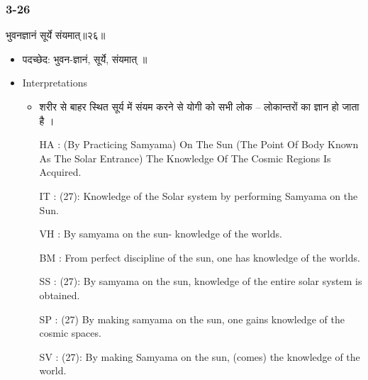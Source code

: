 \begin{frame}[fragile]\frametitle{3-26}
\begin{sanskrit}
भुवनज्ञानं सूर्ये संयमात्॥२६॥
\end{sanskrit}

	\begin{itemize}
	\item पदच्छेद:  भुवन-ज्ञानं, सूर्ये, संयमात् ॥
	\item Interpretations
		\begin{itemize}	
		\item  शरीर से बाहर स्थित सूर्य में संयम करने से योगी को सभी लोक – लोकान्तरों का ज्ञान हो जाता है ।
		\item [HA]: (By Practicing Samyama) On The Sun (The Point Of Body Known As The Solar Entrance) The Knowledge Of The Cosmic Regions Is Acquired.
		\item [IT]: (27): Knowledge of the Solar system by performing Samyama on the Sun.
		\item [VH]: By samyama on the sun- knowledge of the worlds.
		\item [BM]: From perfect discipline of the sun, one has knowledge of the worlds.
		\item [SS]: (27): By samyama on the sun, knowledge of the entire solar system is obtained.
		\item [SP]: (27) By making samyama on the sun, one gains knowledge of the cosmic spaces.
		\item [SV]: (27): By making Samyama on the sun, (comes) the knowledge of the world. 
		\end{itemize}
	\end{itemize}
\end{frame}

